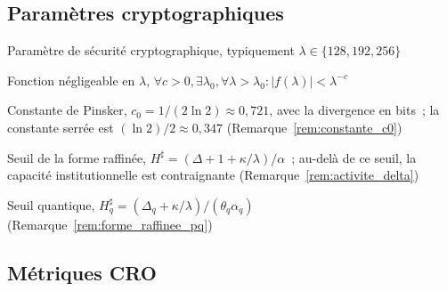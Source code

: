 \begin{sloppypar}
\subsection*{Param\`etres cryptographiques}

\begin{description}[style=nextline,leftmargin=1.5cm,font=\normalfont\bfseries]
\item[$\lambda$] Param\`etre de s\'ecurit\'e cryptographique, typiquement $\lambda \in \{128, 192, 256\}$
\item[$\mathsf{negl}(\lambda)$] Fonction n\'egligeable en $\lambda$, $\forall c>0, \exists \lambda_0, \forall \lambda > \lambda_0: |f(\lambda)| < \lambda^{-c}$
\item[$c_0$] Constante de Pinsker, $c_0 = 1/(2\ln 2) \approx 0{,}721$, avec la divergence en bits~; la constante serr\'ee est $(\ln 2)/2 \approx 0{,}347$ (Remarque~\ref{rem:constante_c0})
\item[$H^\sharp$] Seuil de la forme raffin\'ee, $H^\sharp = (\Delta + 1 + \kappa/\lambda)/\alpha$~; au-del\`a de ce seuil, la capacit\'e institutionnelle est contraignante (Remarque~\ref{rem:activite_delta})
\item[$H^\sharp_q$] Seuil quantique, $H^\sharp_q = (\Delta_q + \kappa/\lambda)/(\theta_q\alpha_q)$ (Remarque~\ref{rem:forme_raffinee_pq})
\end{description}

\subsection*{M\'etriques CRO}


\end{sloppypar}
